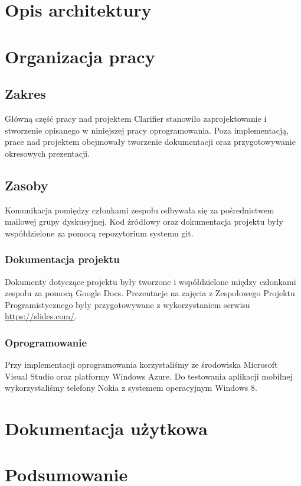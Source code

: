\documentclass{pracamgr}
\begin{document}
\chapter{Opis architektury}\label{r:architecture}

\chapter{Organizacja pracy}\label{r:org}

\section{Zakres}
Główną część pracy nad projektem Clarifier stanowiło zaprojektowanie i stworzenie opisanego w niniejszej pracy oprogramowania. Poza implementacją, prace nad projektem obejmowały tworzenie dokumentacji oraz przygotowywanie okresowych prezentacji. 

\section{Zasoby}
Komunikacja pomiędzy członkami zespołu odbywała się za pośrednictwem mailowej grupy dyskusyjnej. Kod źródłowy oraz dokumentacja projektu były współdzielone za pomocą repozytorium systemu git.

\subsection{Dokumentacja projektu}
Dokumenty dotyczące projektu były tworzone i współdzielone między członkami zespołu za pomocą Google Docs. Prezentacje na zajęcia z Zespołowego Projektu Programistycznego były przygotowywane z wykorzystaniem serwisu \url{https://slides.com/}.

\subsection{Oprogramowanie}
Przy implementacji oprogramowania korzystaliśmy ze środowiska Microsoft Visual Studio oraz platformy Windows Azure. Do testowania aplikacji mobilnej wykorzystaliśmy telefony Nokia z systemem operacyjnym Windows 8.

\chapter{Dokumentacja użytkowa}\label{r:documentation}

\chapter{Podsumowanie}
\end{document}
